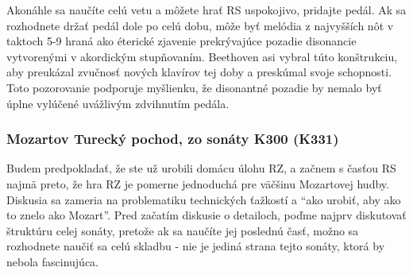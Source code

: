Akonáhle sa naučíte celú vetu a môžete hrať RS uspokojivo, pridajte pedál. Ak sa rozhodnete držať pedál dole po celú dobu, môže byť melódia z najvyšších nôt v taktoch 5-9 hraná ako éterické zjavenie prekrývajúce pozadie disonancie vytvorenými v akordickým stupňovaním. Beethoven asi vybral túto konštrukciu, aby preukázal zvučnosť nových klavírov tej doby a preskúmal svoje schopnosti. Toto pozorovanie podporuje myšlienku, že disonantné pozadie by nemalo byť úplne vylúčené uvážlivým zdvihnutím pedála.

\subsubsection{Mozartov Turecký pochod, zo sonáty K300 (K331)}
Budem predpokladať, že ste už urobili domácu úlohu RZ, a začnem s časťou RS najmä preto, že hra RZ je pomerne jednoduchá pre väčšinu Mozartovej hudby. Diskusia sa zameria na problematiku technických ťažkostí a “ako urobiť, aby ako to znelo ako Mozart”. Pred začatím diskusie o detailoch, poďme najprv diskutovať štruktúru celej sonáty, pretože ak sa naučíte jej poslednú časť, možno sa rozhodnete naučiť sa celú skladbu - nie je jediná strana tejto sonáty, ktorá by nebola fascinujúca.

